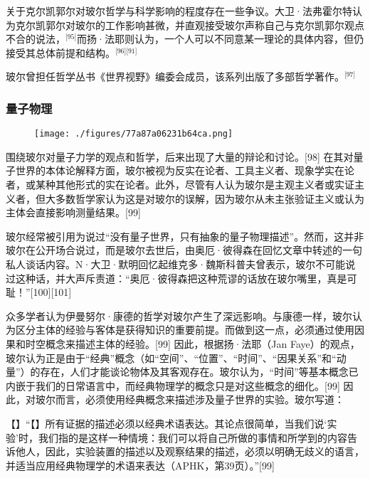 关于克尔凯郭尔对玻尔哲学与科学影响的程度存在一些争议。大卫·法弗霍尔特认为克尔凯郭尔对玻尔的工作影响甚微，并直观接受玻尔声称自己与克尔凯郭尔观点不合的说法，\(^\text{[95]}\)而扬·法耶则认为，一个人可以不同意某一理论的具体内容，但仍接受其总体前提和结构。\(^\text{[96][91]}\)

玻尔曾担任哲学丛书《世界视野》编委会成员，该系列出版了多部哲学著作。\(^\text{[97]}\)
\subsubsection{量子物理}
\begin{figure}[ht]
\centering
\texttt{[image: ./figures/77a87a06231b64ca.png]}
\caption{} \label{fig_NRSbr_8}
\end{figure}
围绕玻尔对量子力学的观点和哲学，后来出现了大量的辩论和讨论。[98] 在其对量子世界的本体论解释方面，玻尔被视为反实在论者、工具主义者、现象学实在论者，或某种其他形式的实在论者。此外，尽管有人认为玻尔是主观主义者或实证主义者，但大多数哲学家认为这是对玻尔的误解，因为玻尔从未主张验证主义或认为主体会直接影响测量结果。[99]

玻尔经常被引用为说过“没有量子世界，只有抽象的量子物理描述”。然而，这并非玻尔在公开场合说过，而是玻尔去世后，由奥厄·彼得森在回忆文章中转述的一句私人谈话内容。N·大卫·默明回忆起维克多·魏斯科普夫曾表示，玻尔不可能说过这种话，并大声斥责道：“奥厄·彼得森把这种荒谬的话放在玻尔嘴里，真是可耻！”[100][101]

众多学者认为伊曼努尔·康德的哲学对玻尔产生了深远影响。与康德一样，玻尔认为区分主体的经验与客体是获得知识的重要前提。而做到这一点，必须通过使用因果和时空概念来描述主体的经验。[99] 因此，根据扬·法耶（Jan Faye）的观点，玻尔认为正是由于“经典”概念（如“空间”、“位置”、“时间”、“因果关系”和“动量”）的存在，人们才能谈论物体及其客观存在。玻尔认为，“时间”等基本概念已内嵌于我们的日常语言中，而经典物理学的概念只是对这些概念的细化。[99] 因此，对玻尔而言，必须使用经典概念来描述涉及量子世界的实验。玻尔写道：

【】“【】所有证据的描述必须以经典术语表达。其论点很简单，当我们说‘实验’时，我们指的是这样一种情境：我们可以将自己所做的事情和所学到的内容告诉他人，因此，实验装置的描述以及观察结果的描述，必须以明确无歧义的语言，并适当应用经典物理学的术语来表达（APHK，第39页）。”[99]
